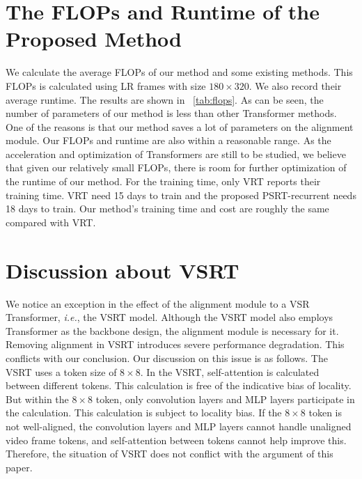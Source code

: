 \documentclass{article}
\newcommand{\ie}{\emph{i.e.}}    \newcommand{\eg}{\emph{e.g.}}    \newcommand{\vs}{\emph{v.s.}}    \newcommand{\etc}{\emph{etc}}     \newcommand{\wo}{\emph{w/o}}     \newcommand{\wi}{\emph{w/}}      \newcommand{\wrt}{\emph{w.r.t.}} \def\etal{\emph{et al.}}
\begin{document}
\vspace{-3mm}
\section{The FLOPs and Runtime of the Proposed Method}
\vspace{-2mm}
We calculate the average FLOPs of our method and some existing methods.
This FLOPs is calculated using LR frames with size $180\times320$.
We also record their average runtime.
The results are shown in \tablename~\ref{tab:flops}.
As can be seen, the number of parameters of our method is less than other Transformer methods.
One of the reasons is that our method saves a lot of parameters on the alignment module.
Our FLOPs and runtime are also within a reasonable range.
As the acceleration and optimization of Transformers are still to be studied, we believe that given our relatively small FLOPs, there is room for further optimization of the runtime of our method.
For the training time, only VRT reports their training time.
VRT need 15 days to train and the proposed PSRT-recurrent needs 18 days to train.
Our method's training time and cost are roughly the same compared with VRT.


\vspace{-3mm}
\section{Discussion about VSRT}
\vspace{-2mm}
We notice an exception in the effect of the alignment module to a VSR Transformer, \ie, the VSRT model.
Although the VSRT model \cite{cao2021video} also employs Transformer as the backbone design, the alignment module is necessary for it.
Removing alignment in VSRT introduces severe performance degradation.
This conflicts with our conclusion.
Our discussion on this issue is as follows.
The VSRT uses a token size of $8\times8$.
In the VSRT, self-attention is calculated between different tokens.
This calculation is free of the indicative bias of locality.
But within the $8\times8$ token, only convolution layers and MLP layers participate in the calculation.
This calculation is subject to locality bias.
If the $8\times8$ token is not well-aligned, the convolution layers and MLP layers cannot handle unaligned video frame tokens, and self-attention between tokens cannot help improve this.
Therefore, the situation of VSRT does not conflict with the argument of this paper.


\vspace{-3mm}
\end{document}

